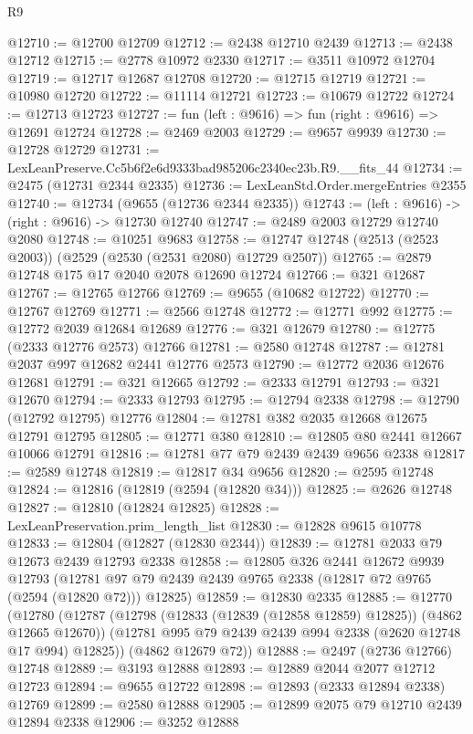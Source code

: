\begin{lexlean}{R9}
\begin{coremodule}
@12710 := @12700 @12709
@12712 := @2438 @12710 @2439
@12713 := @2438 @12712
@12715 := @2778 @10972 @2330
@12717 := @3511 @10972 @12704
@12719 := @12717 @12687 @12708
@12720 := @12715 @12719
@12721 := @10980 @12720
@12722 := @11114 @12721
@12723 := @10679 @12722
@12724 := @12713 @12723
@12727 := fun (left : @9616) => fun (right : @9616) => @12691 @12724
@12728 := @2469 @2003
@12729 := @9657 @9939
@12730 := @12728 @12729
@12731 := LexLeanPreserve.Cc5b6f2e6d9333bad985206c2340ec23b.R9.__fits_44
@12734 := @2475 (@12731 @2344 @2335)
@12736 := LexLeanStd.Order.mergeEntries @2355
@12740 := @12734 (@9655 (@12736 @2344 @2335))
@12743 := (left : @9616) -> (right : @9616) -> @12730 @12740
@12747 := @2489 @2003 @12729 @12740 @2080
@12748 := @10251 @9683
@12758 := @12747 @12748 (@2513 (@2523 @2003)) (@2529 (@2530 (@2531 @2080) @12729 @2507))
@12765 := @2879 @12748 @175 @17 @2040 @2078 @12690 @12724
@12766 := @321 @12687
@12767 := @12765 @12766
@12769 := @9655 (@10682 @12722)
@12770 := @12767 @12769
@12771 := @2566 @12748
@12772 := @12771 @992
@12775 := @12772 @2039 @12684 @12689
@12776 := @321 @12679
@12780 := @12775 (@2333 @12776 @2573) @12766
@12781 := @2580 @12748
@12787 := @12781 @2037 @997 @12682 @2441 @12776 @2573
@12790 := @12772 @2036 @12676 @12681
@12791 := @321 @12665
@12792 := @2333 @12791
@12793 := @321 @12670
@12794 := @2333 @12793
@12795 := @12794 @2338
@12798 := @12790 (@12792 @12795) @12776
@12804 := @12781 @382 @2035 @12668 @12675 @12791 @12795
@12805 := @12771 @380
@12810 := @12805 @80 @2441 @12667 @10066 @12791
@12816 := @12781 @77 @79 @2439 @2439 @9656 @2338
@12817 := @2589 @12748
@12819 := @12817 @34 @9656
@12820 := @2595 @12748
@12824 := @12816 (@12819 (@2594 (@12820 @34)))
@12825 := @2626 @12748
@12827 := @12810 (@12824 @12825)
@12828 := LexLeanPreservation.prim_length_list
@12830 := @12828 @9615 @10778
@12833 := @12804 (@12827 (@12830 @2344))
@12839 := @12781 @2033 @79 @12673 @2439 @12793 @2338
@12858 := @12805
    @326
    @2441
    @12672
    @9939
    @12793
    (@12781 @97 @79 @2439 @2439 @9765 @2338 (@12817 @72 @9765 (@2594 (@12820 @72))) @12825)
@12859 := @12830 @2335
@12885 := @12770
    (@12780
      (@12787
        (@12798 (@12833 (@12839 (@12858 @12859) @12825)) (@4862 @12665 @12670))
        (@12781 @995 @79 @2439 @2439 @994 @2338 (@2620 @12748 @17 @994) @12825))
      (@4862 @12679 @72))
@12888 := @2497 (@2736 @12766) @12748
@12889 := @3193 @12888
@12893 := @12889 @2044 @2077 @12712 @12723
@12894 := @9655 @12722
@12898 := @12893 (@2333 @12894 @2338) @12769
@12899 := @2580 @12888
@12905 := @12899 @2075 @79 @12710 @2439 @12894 @2338
@12906 := @3252 @12888

\end{coremodule}
\end{lexlean}
